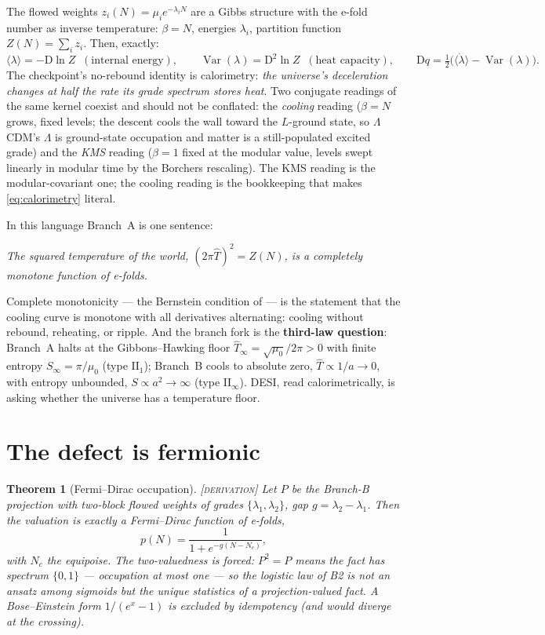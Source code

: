 \documentclass[11pt,reqno]{amsart}
\numberwithin{equation}{section}
\newtheorem{theorem}{Theorem}[section]
\theoremstyle{definition}
\theoremstyle{remark}
\newcommand{\slab}[1]{\textup{[\textsc{#1}]}}
\newcommand{\D}{\mathrm D}
\newcommand{\Var}{\operatorname{Var}}
\begin{document}
The flowed weights $z_i(N)=\mu_ie^{-\lambda_iN}$ are a Gibbs structure
with the e-fold number as inverse temperature: $\beta=N$, energies
$\lambda_i$, partition function $Z(N)=\sum_iz_i$. Then, exactly:
\begin{equation}\label{eq:calorimetry}
\langle\lambda\rangle=-\D\ln Z\;\;(\text{internal energy}),\qquad
\Var(\lambda)=\D^2\ln Z\;\;(\text{heat capacity}),\qquad
\D q=\tfrac12\bigl(\langle\dot\lambda\rangle-\Var(\lambda)\bigr).
\end{equation}
The checkpoint's no-rebound identity is calorimetry: \emph{the universe's
deceleration changes at half the rate its grade spectrum stores heat}.
Two conjugate readings of the same kernel coexist and should not be
conflated: the \emph{cooling} reading ($\beta=N$ grows, fixed levels; the
descent cools the wall toward the $L$-ground state, so $\Lambda$CDM's
$\Lambda$ is ground-state occupation and matter is a still-populated
excited grade) and the \emph{KMS} reading ($\beta=1$ fixed at the modular
value, levels swept linearly in modular time by the Borchers rescaling).
The KMS reading is the modular-covariant one; the cooling reading is the
bookkeeping that makes \eqref{eq:calorimetry} literal.

In this language Branch~A is one sentence:
\begin{center}
\emph{The squared temperature of the world, $(2\pi\hat T)^2=Z(N)$, is a
completely monotone function of e-folds.}
\end{center}
Complete monotonicity --- the Bernstein condition of \cite{Ruble2026c}
--- is the statement that the cooling curve is monotone with all
derivatives alternating: cooling without rebound, reheating, or ripple.
And the branch fork is the \textbf{third-law question}: Branch~A halts at
the Gibbons--Hawking floor $\hat T_\infty=\sqrt{\mu_0}/2\pi>0$ with
finite entropy $S_\infty=\pi/\mu_0$ (type $\mathrm{II}_1$); Branch~B
cools to absolute zero, $\hat T\propto1/a\to0$, with entropy unbounded,
$S\propto a^2\to\infty$ (type $\mathrm{II}_\infty$). DESI, read
calorimetrically, is asking whether the universe has a temperature floor.

\section{The defect is fermionic}\label{sec:fermionic}

\begin{theorem}[Fermi--Dirac occupation]\label{thm:FD}
\slab{derivation} Let $P$ be the Branch-B projection with two-block
flowed weights of grades $\{\lambda_1,\lambda_2\}$, gap
$g=\lambda_2-\lambda_1$. Then the valuation is exactly a Fermi--Dirac
function of e-folds,
\begin{equation}
p(N)=\frac{1}{1+e^{-g(N-N_c)}},
\end{equation}
with $N_c$ the equipoise. The two-valuedness is forced: $P^2=P$ means the
fact has spectrum $\{0,1\}$ --- occupation at most one --- so the
logistic law of B2 is not an ansatz among sigmoids but the unique
statistics of a projection-valued fact. A Bose--Einstein form
$1/(e^{x}-1)$ is excluded by idempotency (and would diverge at the
crossing).
\end{theorem}
\end{document}
